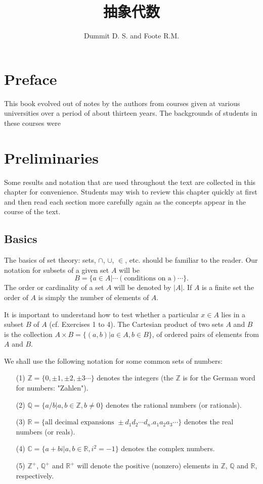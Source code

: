 \documentclass[cn,11pt,chinese]{elegantbook}
\title{抽象代数}
\author{Dummit D. S. and Foote R.M.}
\def\real{\mathbb{R}}
\numberwithin{equation}{section}
\begin{document}
\maketitle

\chapter*{Preface}
This book evolved out of notes by the authors from courses given at various universities over a period of about thirteen years. The backgrounds of students in these courses were 


\chapter*{Preliminaries}\label{chapter000}
Some results and notation that are used throughout the text are collected in this chapter for convenience. Students may wish to review this chapter quickly at first and then read each section more carefully again as the concepts appear in the course of the text.

\section{Basics}\label{section00001}
The basics of set theory: sets, $\cap$, $\cup$, $\in$, etc. should be familiar to the reader. Our notation for subsets of a given set $A$ will be
\[
B = \{a \in A | \cdots (\text{conditions on a}) \cdots\}.
\]
The order or cardinality of a set $A$ will be denoted by $|A|$. If $A$ is a finite set the order of $A$ is simply the number of elements of $A$.

It is important to understand how to test whether a particular $x \in A$ lies in a subset $B$ of $A$ (cf. Exercises 1 to 4). The Cartesian product of two sets $A$ and $B$ is the collection $A \times B = \{(a, b)| a \in A, b \in B\}$, of ordered pairs of elements from $A$ and $B$.

We shall use the following notation for some common sets of numbers:
\begin{enumerate}
\item[(1)] $\mathbb{Z}= \{0, \pm{1}, \pm{2}, \pm{3}\cdots\}$ denotes the integers (the $\mathbb{Z}$ is for the German word for numbers: "Zahlen").
\item[(2)] $\mathbb{Q} = \{a/b|a, b \in \mathbb{Z}, b \neq 0\}$ denotes the rational numbers (or rationals).
\item[(3)] $\real = \{\text{all decimal expansions }\pm{d_1d_2\cdots d_n.a_1a_2a_3\cdots}\}$ denotes the real numbers (or reals).
\item[(4)] $\mathbb{C} = \{a + bi|a, b \in \real, i^2 = -1\}$ denotes the complex numbers.
\item[(5)] $\mathbb{Z}^+$, $\mathbb{Q}^+$ and $\real^+$ will denote the positive (nonzero) elements in $\mathbb{Z}$, $\mathbb{Q}$ and $\real$, respectively.
\end{enumerate}
\end{document}
